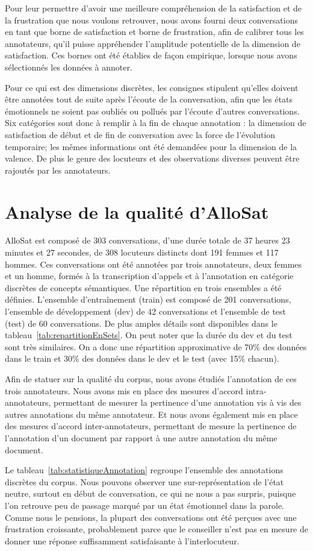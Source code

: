 Pour leur permettre d'avoir une meilleure compréhension de la satisfaction et de la frustration que nous voulons retrouver, nous avons fourni deux conversations en tant que borne de satisfaction et borne de frustration, afin de calibrer tous les annotateurs, qu'il puisse appréhender l'amplitude potentielle de la dimension de satisfaction. Ces bornes ont été établies de façon empirique, lorsque nous avons sélectionnés les données à annoter.

Pour ce qui est des dimensions discrètes, les consignes stipulent qu'elles doivent être annotées tout de suite après l'écoute de la conversation, afin que les états émotionnels ne soient pas oubliés ou pollués par l'écoute d'autres conversations.
Six catégories sont donc à remplir à la fin de chaque annotation : la dimension de satisfaction de début et de fin de conversation avec la force de l'évolution temporaire; les mêmes informations ont été demandées pour la dimension de la valence. De plus le genre des locuteurs et des observations diverses peuvent être rajoutés par les annotateurs.

\section{Analyse de la qualité d'AlloSat}
AlloSat est composé de 303 conversations, d'une durée totale de 37 heures 23 minutes et 27 secondes, de 308 locuteurs distincts dont 191 femmes et 117 hommes.
Ces conversations ont été annotées par trois annotateurs, deux femmes et un homme, formés à la transcription d'appels et à l'annotation en catégorie discrètes de concepts sémantiques.
Une répartition en trois ensembles a été définies. L'ensemble d’entraînement (train) est composé de 201 conversations, l'ensemble de développement (dev) de 42 conversations et l'ensemble de test (test) de 60 conversations. De plus amples détails sont disponibles dans le tableau~\ref{tab:repartitionEnSets}. On peut noter que la durée du dev et du test sont très similaires. On a donc une répartition approximative de 70\% des données dans le train et 30\% des données dans le dev et le test (avec 15\% chacun).


Afin de statuer sur la qualité du corpus, nous avons étudiés l'annotation de ces trois annotateurs. Nous avons mis en place des mesures d'accord intra-annotateurs, permettant de mesurer la pertinence d'une annotation vis à vis des autres annotations du même annotateur. Et nous avons également mis en place des mesures d'accord inter-annotateurs, permettant de mesure la pertinence de l'annotation d'un document par rapport à une autre annotation du même document.

Le tableau~\ref{tab:statistiqueAnnotation} regroupe l'ensemble des annotations discrètes du corpus. Nous pouvons observer une sur-représentation de l'état neutre, surtout en début de conversation, ce qui ne nous a pas surpris, puisque l'on retrouve peu de passage marqué par un état émotionnel dans la parole. Comme nous le pensions, la plupart des conversations ont été perçues avec une frustration croissante, probablement parce que le conseiller n’est pas en mesure de donner une réponse suffisamment satisfaisante à l’interlocuteur.

